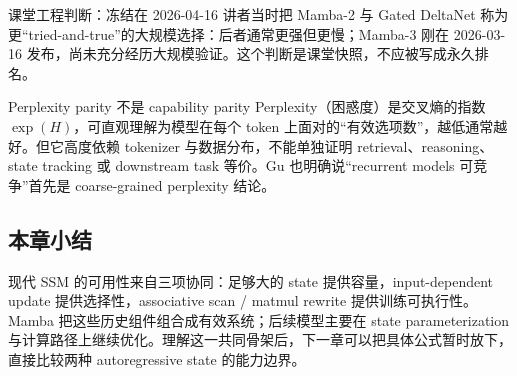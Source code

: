 \begin{knowledgebox}{课堂工程判断：冻结在 2026-04-16}
讲者当时把 Mamba-2 与 Gated DeltaNet 称为更“tried-and-true”的大规模选择：后者通常更强但更慢；Mamba-3 刚在 2026-03-16 发布，尚未充分经历大规模验证。这个判断是课堂快照，不应被写成永久排名。
\end{knowledgebox}

\begin{warningbox}{Perplexity parity 不是 capability parity}
Perplexity（困惑度）是交叉熵的指数 $\exp(H)$，可直观理解为模型在每个 token 上面对的“有效选项数”，越低通常越好。但它高度依赖 tokenizer 与数据分布，不能单独证明 retrieval、reasoning、state tracking 或 downstream task 等价。Gu 也明确说“recurrent models 可竞争”首先是 coarse-grained perplexity 结论。
\end{warningbox}

\subsection{本章小结}

现代 SSM 的可用性来自三项协同：足够大的 state 提供容量，input-dependent update 提供选择性，associative scan / matmul rewrite 提供训练可执行性。Mamba 把这些历史组件组合成有效系统；后续模型主要在 state parameterization 与计算路径上继续优化。理解这一共同骨架后，下一章可以把具体公式暂时放下，直接比较两种 autoregressive state 的能力边界。

